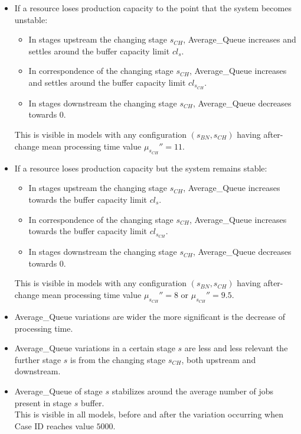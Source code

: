 \begin{itemize}
\item If a resource loses production capacity to the point that the system becomes unstable:
\begin{itemize}
\item In stages upstream the changing stage $s_{CH}$, Average\_Queue increases and settles around the buffer capacity limit $cl_s$.
\item In correspondence of the changing stage $s_{CH}$, Average\_Queue increases and settles around the buffer capacity limit $cl_{s_{CH}}$.
\item In stages downstream the changing stage $s_{CH}$, Average\_Queue decreases towards $0$.
\end{itemize}
This is visible in models with any configuration $(s_{BN},s_{CH})$ having after-change mean processing time value $\mu_{s_{CH}}''=11$.
\item If a resource loses production capacity but the system remains stable:
\begin{itemize}
\item In stages upstream the changing stage $s_{CH}$, Average\_Queue increases towards the buffer capacity limit $cl_s$.
\item In correspondence of the changing stage $s_{CH}$, Average\_Queue increases towards the buffer capacity limit $cl_{s_{CH}}$.
\item In stages downstream the changing stage $s_{CH}$, Average\_Queue decreases towards $0$.
\end{itemize}
This is visible in models with any configuration $(s_{BN},s_{CH})$ having after-change mean processing time value $\mu_{s_{CH}}''=8$ or $\mu_{s_{CH}}''=9.5$.
\item Average\_Queue variations are wider the more significant is the decrease of processing time.
\item Average\_Queue variations in a certain stage $s$ are less and less relevant the further stage $s$ is from the changing stage $s_{CH}$, both upstream and downstream. 
\item Average\_Queue of stage $s$ stabilizes around the average number of jobs present in stage $s$ buffer. \\This is visible in all models, before and after the variation occurring when Case ID reaches value $5000$.
\end{itemize}
